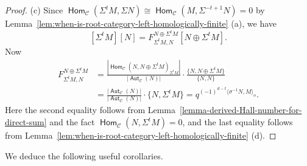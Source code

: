 \documentclass[reqno,12pt,a4paper]{amsart}
\theoremstyle{remark}
\theoremstyle{definition}
\newcommand{\opname}[1]{\operatorname{\mathsf{#1}}}
\newcommand{\Hom}{\opname{Hom}}
\newcommand{\Aut}{\opname{Aut}}
\newcommand{\cc}{{\mathcal C}}
\numberwithin{equation}{section}
\begin{document}
\begin{proof}
(c) Since $\Hom_\cc(\Sigma^t M,\Sigma N)\cong\Hom_\cc(M,\Sigma^{-t+1}N)=0$ by Lemma~\ref{lem:when-is-root-category-left-homologically-finite} (a), we have
\[
[\Sigma^t M][N]=F_{\Sigma^t M,N}^{N\oplus\Sigma^t M}[N\oplus \Sigma^t M].
\]
Now
\begin{align*}
F_{\Sigma^t M,N}^{N\oplus\Sigma^t M}&=\frac{|\Hom_\cc(N,N\oplus \Sigma^t M)_{\Sigma^t M}|}{|\Aut_\cc(N)|}\cdot\frac{\{N,N\oplus\Sigma^t M\}}{\{N,N\}}\\
&=\frac{|\Aut_\cc(N)|}{|\Aut_\cc(N)|}\cdot\{N,\Sigma^t M\}=q^{(-1)^{d-t}\langle\sigma^{-1}N,M\rangle_o}.
\end{align*}
Here the second equality follows from Lemma~\ref{lemma-derived-Hall-number-for-direct-sum} and the fact $\Hom_\cc(N,\Sigma^t M)=0$, and the last equality follows from Lemma~\ref{lem:when-is-root-category-left-homologically-finite} (d).
\end{proof}

We deduce the following useful corollaries.
\end{document}
